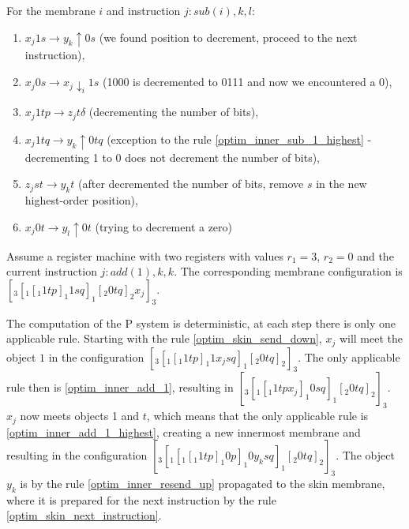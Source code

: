 \documentclass[submission,copyright,creativecommons]{../lib/lncs/llncs}
\begin{document}
For the membrane $i$ and instruction $j: sub(i),k,l$:
\begin{enumerate}[resume]
  \item\label{optim_inner_sub_1} $x_j1s \rightarrow y_k \uparrow 0s$ (we found position to decrement, proceed to the next instruction),
  \item\label{optim_inner_sub_0} $x_j0s \rightarrow x_j\downarrow_i 1s$ (1000 is decremented to 0111 and now we encountered a 0),
  \item\label{optim_inner_sub_1_highest} $x_j1tp \rightarrow z_jt \delta$ (decrementing the number of bits),
  \item\label{optim_inner_sub_1_highest_1} $x_j1tq \rightarrow y_k\uparrow 0tq$ (exception to the rule \ref{optim_inner_sub_1_highest} - decrementing 1 to 0 does not decrement the number of bits),
  \item\label{optim_inner_sub_remove_s} $z_jst \rightarrow y_kt$ (after decremented the number of bits, remove $s$ in the new highest-order position),
  \item\label{optim_inner_sub_0_highest} $x_j0t \rightarrow y_l \uparrow 0t$ (trying to decrement a zero)
\end{enumerate}

\begin{example}
  Assume a register machine with two registers with values $r_1=3$, $r_2=0$ and the current instruction $j: add(1),k,k$. The corresponding membrane configuration is $[_3 [_1 [_1 1 t p ]_1 1 s q ]_1 [_2 0 t q ]_2 x_j ]_3$.

  The computation of the P system is deterministic, at each step there is only one applicable rule. Starting with the rule \ref{optim_skin_send_down}, $x_j$ will meet the object $1$ in the configuration $[_3 [_1 [_1 1 t p ]_1 1 x_j s q ]_1 [_2 0 t q ]_2 ]_3$. The only applicable rule then is \ref{optim_inner_add_1}, resulting in $[_3 [_1 [_1 1 t p x_j ]_1 0 s q ]_1 [_2 0 t q ]_2 ]_3$. $x_j$ now meets objects 1 and $t$, which means that the only applicable rule is \ref{optim_inner_add_1_highest}, creating a new innermost membrane and resulting in the configuration $[_3 [_1 [_1 [_1 1 t p ]_1 0 p ]_1 0 y_k s q ]_1 [_2 0 t q ]_2 ]_3$. The object $y_k$ is by the rule \ref{optim_inner_resend_up} propagated to the skin membrane, where it is prepared for the next instruction by the rule \ref{optim_skin_next_instruction}.
\end{example}
\end{document}
